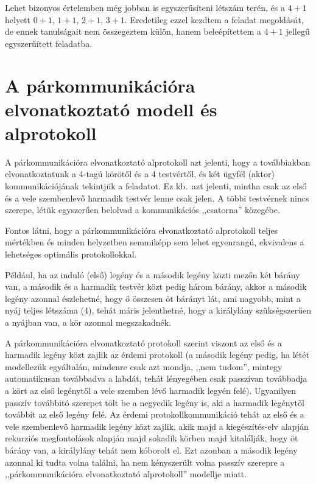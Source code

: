 \documentclass{article}
\begin{document}
	Lehet bizonyos értelemben még jobban is egyszerűsíteni létszám terén, és a $4+1$ helyett $0+1$,  $1+1$,  $2+1$,  $3+1$. Eredetileg ezzel kezdtem a feladat megoldását, de ennek tanulságait nem összegeztem külön, hanem beleépítettem a $4+1$ jellegű egyszerűített feladatba.


	\section{A párkommunikációra elvonatkoztató modell és alprotokoll}

	A párkommunikációra elvonatkoztató alprotokoll azt jelenti, hogy a továbbiakban elvonatkoztatunk a 4-tagú körötől és a 4 testvértől, és két ügyfél (aktor) kommunikációjának tekintjük a feladatot.
	Ez kb.~azt jelenti, mintha csak az első és a vele szembenlevő harmadik testvér lenne csak jelen. A többi testvérnek nincs szerepe, létük egyszerűen belolvad a kommunikációs ,,csatorna'' közegébe. 

	Fontos látni, hogy a párkommunikációra elvonatkoztató alprotokoll teljes mértékben és minden helyzetben semmiképp sem lehet egyenrangú, ekvivalens a lehetséges optimális protokollokkal.

	Például, ha az induló (első) legény és a második legény közti mezőn két bárány van, a második és a harmadik testvér közt pedig három bárány, akkor a második legény azonnal észlehetné, hogy ő összesen öt bárányt lát, ami nagyobb, mint a nyáj teljes létszáma (4), tehát máris jelenthetné, hogy a királylány szükségszerűen a nyájban van, a kör azonnal megszakadnék.

	A párkommunikációra elvonatkoztató protokoll szerint viszont az első és a harmadik legény közt zajlik az  érdemi protokoll (a második legény pedig, ha létét modellezük egyáltalán, mindenre csak azt mondja, ,,nem tudom'', mintegy automatikusan továbbadva a labdát, tehát lényegében csak passzívan továbbadja a kört az első legénytől a vele szemben lévő harmadik legyén felé). Ugyanilyen passzív továbbitó szerepet tölt be a negyedik legény is, aki a harmadik legénytől továbbít az első legény felé. Az érdemi protokollkommunikáció tehát az első és a vele szembenlevő harmadik legény közt zajlik, akik majd a kiegészítés-elv alapján rekurziós megfontolások alapján majd sokadik körben majd kitalálják, hogy öt bárány van, a királylány tehát nem kóborolt el. Ezt azonban a második legény azonnal ki tudta volna találni, ha nem kényszerült volna passzív szerepre a ,,párkommunikációra elvonatkoztató alprotokoll'' modellje miatt.
\end{document}
